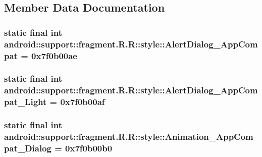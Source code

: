 \subsection{Member Data Documentation}
\hypertarget{classandroid_1_1support_1_1fragment_1_1_r_1_1style_e5894001a41fa29157228a826dd6cc40}{
\subsubsection[{AlertDialog\_\-AppCompat}]{\setlength{\rightskip}{0pt plus 5cm}static final int android::support::fragment.R.R::style::AlertDialog\_\-AppCompat = 0x7f0b00ae}}
\label{classandroid_1_1support_1_1fragment_1_1_r_1_1style_e5894001a41fa29157228a826dd6cc40}


\hypertarget{classandroid_1_1support_1_1fragment_1_1_r_1_1style_b3f4e25a39d671780994ed6ce04799ab}{
\subsubsection[{AlertDialog\_\-AppCompat\_\-Light}]{\setlength{\rightskip}{0pt plus 5cm}static final int android::support::fragment.R.R::style::AlertDialog\_\-AppCompat\_\-Light = 0x7f0b00af}}
\label{classandroid_1_1support_1_1fragment_1_1_r_1_1style_b3f4e25a39d671780994ed6ce04799ab}


\hypertarget{classandroid_1_1support_1_1fragment_1_1_r_1_1style_6a9f87c35d6d74c3e210e969ba546f30}{
\subsubsection[{Animation\_\-AppCompat\_\-Dialog}]{\setlength{\rightskip}{0pt plus 5cm}static final int android::support::fragment.R.R::style::Animation\_\-AppCompat\_\-Dialog = 0x7f0b00b0}}
\label{classandroid_1_1support_1_1fragment_1_1_r_1_1style_6a9f87c35d6d74c3e210e969ba546f30}



